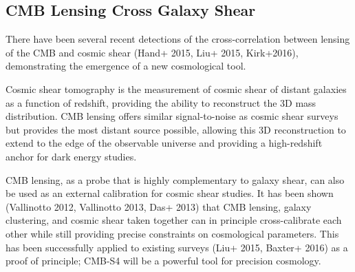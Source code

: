 

\subsection{CMB Lensing Cross Galaxy Shear}


There have been several recent detections of the cross-correlation between lensing of the CMB and cosmic shear (Hand+ 2015, Liu+ 2015, Kirk+2016), demonstrating the emergence of a new cosmological tool. 

Cosmic shear tomography is the measurement of cosmic shear of distant galaxies as a function of redshift, providing the ability to reconstruct the 3D mass distribution. CMB lensing offers similar signal-to-noise as cosmic shear surveys but provides the most distant source possible, allowing this 3D reconstruction to extend to the edge of the observable universe and providing a high-redshift anchor for dark energy studies.

CMB lensing, as a probe that is highly complementary to galaxy shear, can also be used as an external calibration for cosmic shear studies. It has been shown 
(Vallinotto 2012, Vallinotto 2013, Das+ 2013) that CMB lensing, galaxy clustering, and cosmic shear taken together can in principle cross-calibrate each other while still providing precise constraints on cosmological parameters. This has been successfully applied to existing surveys (Liu+ 2015, Baxter+ 2016)
as a proof of principle; CMB-S4 will be a powerful tool for precision
cosmology.


